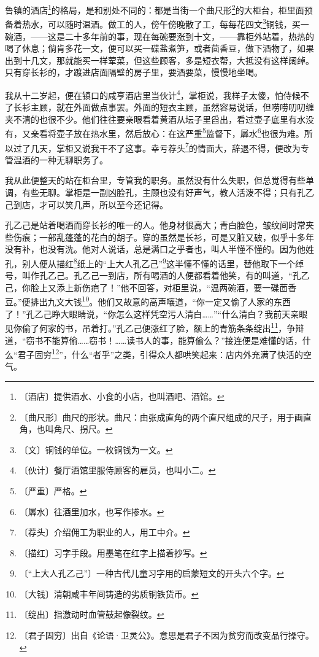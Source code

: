 \documentclass[12pt,UTF-8,openany]{ctexbook}
\begin{document}
\begin{normalsize}
    
    鲁镇的酒店\footnote{〔酒店〕提供酒水、小食的小店，也叫酒吧、酒馆。}的格局，是和别处不同的：都是当街一个曲尺形\footnote{〔曲尺形〕曲尺的形状。曲尺：由张成直角的两个直尺组成的尺子，用于画直角，也叫角尺、拐尺。}的大柜台，柜里面预备着热水，可以随时温酒。做工的人，傍午傍晚散了工，每每花四文\footnote{〔文〕铜钱的单位。一枚铜钱为一文。}铜钱，买一碗酒，——这是二十多年前的事，现在每碗要涨到十文，——靠柜外站着，热热的喝了休息；倘肯多花一文，便可以买一碟盐煮笋，或者茴香豆，做下酒物了，如果出到十几文，那就能买一样荤菜，但这些顾客，多是短衣帮，大抵没有这样阔绰。只有穿长衫的，才踱进店面隔壁的房子里，要酒要菜，慢慢地坐喝。
    
    我从十二岁起，便在镇口的咸亨酒店里当伙计\footnote{〔伙计〕餐厅酒馆里服侍顾客的雇员，也叫小二。}，掌柜说，我样子太傻，怕侍候不了长衫主顾，就在外面做点事罢。外面的短衣主顾，虽然容易说话，但唠唠叨叨缠夹不清的也很不少。他们往往要亲眼看着黄酒从坛子里舀出，看过壶子底里有水没有，又亲看将壶子放在热水里，然后放心：在这严重\footnote{〔严重〕严格。}监督下，羼水\footnote{〔羼水〕往酒里加水，也写作掺水。}也很为难。所以过了几天，掌柜又说我干不了这事。幸亏荐头\footnote{〔荐头〕介绍佣工为职业的人，用工中介。}的情面大，辞退不得，便改为专管温酒的一种无聊职务了。
    
    我从此便整天的站在柜台里，专管我的职务。虽然没有什么失职，但总觉得有些单调，有些无聊。掌柜是一副凶脸孔，主顾也没有好声气，教人活泼不得；只有孔乙己到店，才可以笑几声，所以至今还记得。
    
    孔乙己是站着喝酒而穿长衫的唯一的人。他身材很高大；青白脸色，皱纹间时常夹些伤痕；一部乱蓬蓬的花白的胡子。穿的虽然是长衫，可是又脏又破，似乎十多年没有补，也没有洗。他对人说话，总是满口之乎者也，叫人半懂不懂的。因为他姓孔，别人便从描红\footnote{〔描红〕习字手段。用墨笔在红字上描着抄写。}纸上的“上大人孔乙己”\footnote{〔“上大人孔乙己”〕一种古代儿童习字用的启蒙短文的开头六个字。}这半懂不懂的话里，替他取下一个绰号，叫作孔乙己。孔乙己一到店，所有喝酒的人便都看着他笑，有的叫道，“孔乙己，你脸上又添上新伤疤了！”他不回答，对柜里说，“温两碗酒，要一碟茴香豆。”便排出九文大钱\footnote{〔大钱〕清朝咸丰年间铸造的劣质铜铁货币。}。他们又故意的高声嚷道，“你一定又偷了人家的东西了！”孔乙己睁大眼睛说，“你怎么这样凭空污人清白……”“什么清白？我前天亲眼见你偷了何家的书，吊着打。”孔乙己便涨红了脸，额上的青筋条条绽出\footnote{〔绽出〕指激动时血管鼓起像裂纹。}，争辩道，“窃书不能算偷……窃书！……读书人的事，能算偷么？”接连便是难懂的话，什么“君子固穷\footnote{〔君子固穷〕出自《论语·卫灵公》。意思是君子不因为贫穷而改变品行操守。}”，什么“者乎”之类，引得众人都哄笑起来：店内外充满了快活的空气。
    

\end{normalsize}
\end{document}
